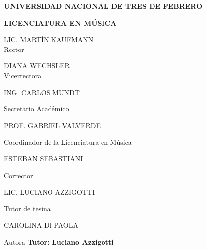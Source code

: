 \begin{titlepage}
		{\LARGE \textbf {UNIVERSIDAD NACIONAL DE TRES DE FEBRERO}}
		
		{\Large \textbf {LICENCIATURA EN MÚSICA}}
		
		\vspace{2cm}
		
		{\Large LIC. MARTÍN KAUFMANN\\[0.1em]Rector}
		
		\vspace{1cm}
		
		{\Large DIANA WECHSLER \\[0.1em]Vicerrectora}
		
		\vspace{1cm}
		

		
		
		ING. CARLOS MUNDT 
		
		Secretario Académico 
		
		PROF. GABRIEL VALVERDE 
		
		Coordinador de la Licenciatura en Música 
		
		ESTEBAN SEBASTIANI 
		
		Corrector 
		
		LIC. LUCIANO AZZIGOTTI 
		
		Tutor de tesina 
		
		CAROLINA DI PAOLA 
		
		Autora 
		{\Large \textbf{Tutor: Luciano Azzigotti}}
\end{titlepage}

 

